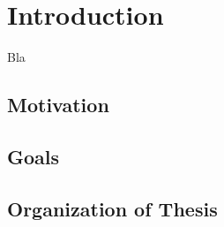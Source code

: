 \chapter{Introduction}
Bla \cite{arsanjani2004service} \cite{avivzienis2004basic} \cite{baldauf2007survey} \cite{barreradesign} \cite{dey2000providing} \cite{kian2010federated} \cite{knappmeyer2010contextml} \cite{skeen1981nonblocking} \cite{crippa2010}

\section{Motivation}

\section{Goals}

\section{Organization of Thesis} 
